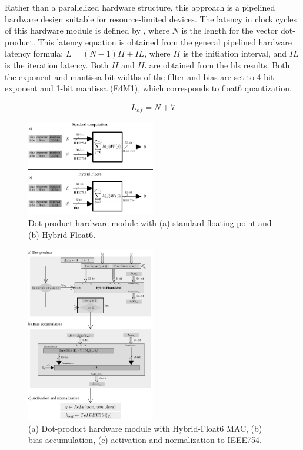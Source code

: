 Rather than a parallelized hardware structure, this approach is a pipelined hardware design suitable for resource-limited devices. The latency in clock cycles of this hardware module is defined by , where $N$ is the length for the vector dot-product. This latency equation is obtained from the general pipelined hardware latency formula: $L=\left(N-1\right)II+IL$, where $II$ is the initiation interval, and $IL$ is the iteration latency. Both $II$ and $IL$ are obtained from the \gls{hls} results. Both the exponent and mantissa bit widths of the filter and bias are set to 4-bit exponent and 1-bit mantissa (E4M1), which corresponds to float6 quantization.

\begin{eqnarray} \label{eq:dot_custom_float_latency}
L_{hf}=N+7
\end{eqnarray}

\begin{figure}[t!]
	\centering
	\includegraphics[width=0.5\textwidth]{./chapters/cnn_accelerator/figures/dot-product_unit.pdf}
	\caption{Dot-product hardware module with (a) standard floating-point and (b) Hybrid-Float6.}
	\label{fig:dot_product}
\end{figure}

\begin{figure}[t!]
	\centering
	\includegraphics[width=0.5\textwidth]{./chapters/cnn_accelerator/figures/dot_product_hybrid.pdf}
	\caption{(a) Dot-product hardware module with Hybrid-Float6 MAC, (b) bias accumulation, (c) activation and normalization to IEEE754.}
	\label{fig:dot_product_loop}
\end{figure}

